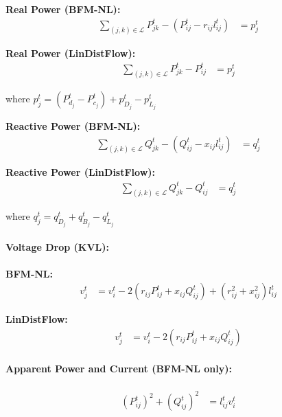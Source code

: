 \textbf{Real Power (BFM-NL):}
\begin{align}
    {\sum_{(j, k) \in \mathcal{L}} P_{jk}^t - \left(P_{ij}^t - r_{ij}l_{ij}^t\right)} &= p_j^t
    \label{eq:mpopf-tradeoffs-real-balance-nl}
\end{align}

\textbf{Real Power (LinDistFlow):}
\begin{align}
    {\sum_{(j, k) \in \mathcal{L}} P_{jk}^t - P_{ij}^t} &= p_j^t
    \label{eq:mpopf-tradeoffs-real-balance-l}
\end{align}

where \(p_j^t = (P_{d_j}^t - P_{c_j}^t) + p^t_{D_j} - p^t_{L_j}\)

\textbf{Reactive Power (BFM-NL):}
\begin{align}
    {\sum_{(j, k) \in \mathcal{L}} Q_{jk}^t - \left(Q_{ij}^t - x_{ij}l_{ij}^t\right)} &= q_j^t
    \label{eq:mpopf-tradeoffs-reactive-balance-nl}
\end{align}

\textbf{Reactive Power (LinDistFlow):}
\begin{align}
    {\sum_{(j, k) \in \mathcal{L}} Q_{jk}^t - Q_{ij}^t} &= q_j^t
    \label{eq:mpopf-tradeoffs-reactive-balance-l}
\end{align}

where \(q_j^t = q_{D_j}^t + q_{B_j}^t - q^t_{L_j}\)

\paragraph{Voltage Drop (KVL):}

\textbf{BFM-NL:}
\begin{align}
    {v_j^t} &= {v_{i}^t - 2(r_{ij}P_{ij}^t + x_{ij}Q_{ij}^t) + (r_{ij}^2 + x_{ij}^2)l_{ij}^t}  
    \label{eq:mpopf-tradeoffs-kvl-nl}
\end{align}

\textbf{LinDistFlow:}
\begin{align}
    {v_j^t} &= {v_{i}^t - 2(r_{ij}P_{ij}^t + x_{ij}Q_{ij}^t) }  
    \label{eq:mpopf-tradeoffs-kvl-l}
\end{align}

\paragraph{Apparent Power and Current (BFM-NL only):}
\begin{align}
    {(P_{ij}^{t})^2 + (Q_{ij}^{t})^2} &= {l_{ij}^t v_i^t} 
    \label{eq:mpopf-tradeoffs-apparent-power}
\end{align}

